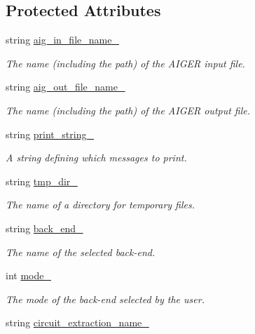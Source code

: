 \subsection*{Protected Attributes}
\begin{DoxyCompactItemize}
\item 
string \hyperlink{classOptions_a334d015adb6fd67b0b1ce3663cd8ce02}{aig\-\_\-in\-\_\-file\-\_\-name\-\_\-}
\begin{DoxyCompactList}\small\item\em The name (including the path) of the A\-I\-G\-E\-R input file. \end{DoxyCompactList}\item 
string \hyperlink{classOptions_a35b7f590e9d752f297d3a99f855da970}{aig\-\_\-out\-\_\-file\-\_\-name\-\_\-}
\begin{DoxyCompactList}\small\item\em The name (including the path) of the A\-I\-G\-E\-R output file. \end{DoxyCompactList}\item 
string \hyperlink{classOptions_a6a29a69625b7962036c8c39746afc5c3}{print\-\_\-string\-\_\-}
\begin{DoxyCompactList}\small\item\em A string defining which messages to print. \end{DoxyCompactList}\item 
string \hyperlink{classOptions_a9428fdd0bd5f4f256c18a4d7db9c0647}{tmp\-\_\-dir\-\_\-}
\begin{DoxyCompactList}\small\item\em The name of a directory for temporary files. \end{DoxyCompactList}\item 
string \hyperlink{classOptions_ab049675ae9fd3fc7693dfa53266da8c8}{back\-\_\-end\-\_\-}
\begin{DoxyCompactList}\small\item\em The name of the selected back-\/end. \end{DoxyCompactList}\item 
int \hyperlink{classOptions_a4554d07501f73bbccb9e2628016f2d20}{mode\-\_\-}
\begin{DoxyCompactList}\small\item\em The mode of the back-\/end selected by the user. \end{DoxyCompactList}\item 
string \hyperlink{classOptions_a08739163aad2d558d5a96f1f27f4f7d8}{circuit\-\_\-extraction\-\_\-name\-\_\-}

\end{DoxyCompactItemize}
